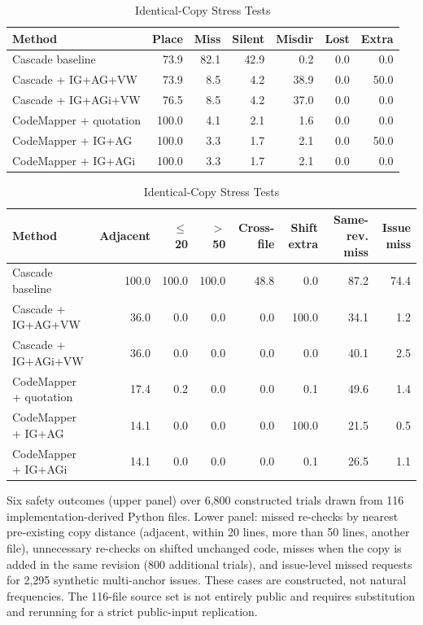 \documentclass[10pt,conference,letterpaper]{IEEEtran}
\begin{document}
\begin{table}[!t]
\caption{Identical-Copy Stress Tests}
\label{tab:copy-tests}
\centering\footnotesize\setlength{\tabcolsep}{5.0pt}
\renewcommand{\arraystretch}{1.15}
\begin{tabular}{lrrrrrr}
\hline
Method & Place & Miss & Silent & Misdir & Lost & Extra \\
\hline
Cascade baseline & 73.9 & 82.1 & 42.9 & 0.2 & 0.0 & 0.0 \\
Cascade + IG+AG+VW & 73.9 & 8.5 & 4.2 & 38.9 & 0.0 & 50.0 \\
Cascade + IG+AGi+VW & 76.5 & 8.5 & 4.2 & 37.0 & 0.0 & 0.0 \\
CodeMapper + quotation & 100.0 & 4.1 & 2.1 & 1.6 & 0.0 & 0.0 \\
CodeMapper + IG+AG & 100.0 & 3.3 & 1.7 & 2.1 & 0.0 & 50.0 \\
CodeMapper + IG+AGi & 100.0 & 3.3 & 1.7 & 2.1 & 0.0 & 0.0 \\
\hline
\end{tabular}
\par\vspace{6pt}
\begin{tabular}{lrrrrrrr}
\hline
Method & Adjacent & $\leq$20 & $>$50 & Cross-file & Shift extra & Same-rev. miss & Issue miss \\
\hline
Cascade baseline & 100.0 & 100.0 & 100.0 & 48.8 & 0.0 & 87.2 & 74.4 \\
Cascade + IG+AG+VW & 36.0 & 0.0 & 0.0 & 0.0 & 100.0 & 34.1 & 1.2 \\
Cascade + IG+AGi+VW & 36.0 & 0.0 & 0.0 & 0.0 & 0.0 & 40.1 & 2.5 \\
CodeMapper + quotation & 17.4 & 0.2 & 0.0 & 0.0 & 0.1 & 49.6 & 1.4 \\
CodeMapper + IG+AG & 14.1 & 0.0 & 0.0 & 0.0 & 100.0 & 21.5 & 0.5 \\
CodeMapper + IG+AGi & 14.1 & 0.0 & 0.0 & 0.0 & 0.1 & 26.5 & 1.1 \\
\hline
\end{tabular}
\parbox{.97\textwidth}{\footnotesize Six safety outcomes (upper panel) over 6,800 constructed trials drawn from 116 implementation-derived Python files. Lower panel: missed re-checks by nearest pre-existing copy distance (adjacent, within 20 lines, more than 50 lines, another file), unnecessary re-checks on shifted unchanged code, misses when the copy is added in the same revision (800 additional trials), and issue-level missed requests for 2,295 synthetic multi-anchor issues. These cases are constructed, not natural frequencies. The 116-file source set is not entirely public and requires substitution and rerunning for a strict public-input replication.}
\end{table}
\end{document}
